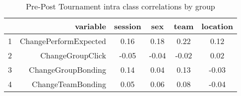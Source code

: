\begin{table}[ht]
\centering
\begin{tabular}{rrcccc}
  \hline
 & variable & session & sex & team & location \\ 
  \hline
1 & ChangePerformExpected & 0.16 & 0.18 & 0.22 & 0.12 \\ 
  2 & ChangeGroupClick & -0.05 & -0.04 & -0.02 & 0.02 \\ 
  3 & ChangeGroupBonding & 0.14 & 0.04 & 0.13 & -0.03 \\ 
  4 & ChangeTeamBonding & 0.05 & 0.06 & 0.08 & -0.04 \\ 
   \hline
\end{tabular}
\caption{Pre-Post Tournament intra class correlations by group} 
\label{tab:ICCTablePrePost}
\end{table}
